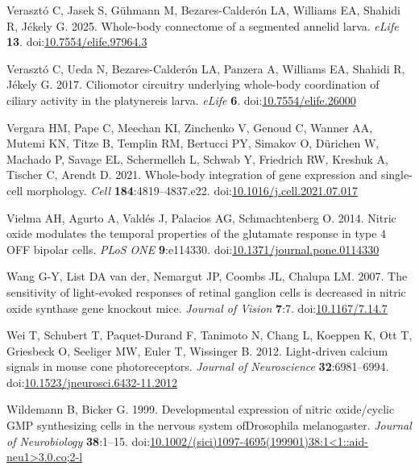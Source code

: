 \documentclass[
  11pt,
  letterpaper,
  DIV=11,
  numbers=noendperiod]{scrartcl}
\newlength{\cslhangindent}
\newenvironment{CSLReferences}[2] %
 {\begin{list}{}{%
  \setlength{\itemindent}{0pt}
  \setlength{\leftmargin}{0pt}
  \setlength{\parsep}{0pt}
  \ifodd #1
   \setlength{\leftmargin}{\cslhangindent}
   \setlength{\itemindent}{-1\cslhangindent}
  \fi
  \setlength{\itemsep}{#2\baselineskip}}}
 {\end{list}}
\begin{document}
\begin{CSLReferences}{1}{0}
Verasztó C, Jasek S, Gühmann M, Bezares-Calderón LA, Williams EA,
Shahidi R, Jékely G. 2025. Whole-body connectome of a segmented annelid
larva. \emph{eLife} \textbf{13}.
doi:\href{https://doi.org/10.7554/elife.97964.3}{10.7554/elife.97964.3}

Verasztó C, Ueda N, Bezares-Calderón LA, Panzera A, Williams EA, Shahidi
R, Jékely G. 2017. Ciliomotor circuitry underlying whole-body
coordination of ciliary activity in the platynereis larva. \emph{eLife}
\textbf{6}.
doi:\href{https://doi.org/10.7554/elife.26000}{10.7554/elife.26000}

Vergara HM, Pape C, Meechan KI, Zinchenko V, Genoud C, Wanner AA, Mutemi
KN, Titze B, Templin RM, Bertucci PY, Simakov O, Dürichen W, Machado P,
Savage EL, Schermelleh L, Schwab Y, Friedrich RW, Kreshuk A, Tischer C,
Arendt D. 2021. Whole-body integration of gene expression and
single-cell morphology. \emph{Cell} \textbf{184}:4819--4837.e22.
doi:\href{https://doi.org/10.1016/j.cell.2021.07.017}{10.1016/j.cell.2021.07.017}

Vielma AH, Agurto A, Valdés J, Palacios AG, Schmachtenberg O. 2014.
Nitric oxide modulates the temporal properties of the glutamate response
in type 4 OFF bipolar cells. \emph{PLoS ONE} \textbf{9}:e114330.
doi:\href{https://doi.org/10.1371/journal.pone.0114330}{10.1371/journal.pone.0114330}

Wang G-Y, List DA van der, Nemargut JP, Coombs JL, Chalupa LM. 2007. The
sensitivity of light-evoked responses of retinal ganglion cells is
decreased in nitric oxide synthase gene knockout mice. \emph{Journal of
Vision} \textbf{7}:7.
doi:\href{https://doi.org/10.1167/7.14.7}{10.1167/7.14.7}

Wei T, Schubert T, Paquet-Durand F, Tanimoto N, Chang L, Koeppen K, Ott
T, Griesbeck O, Seeliger MW, Euler T, Wissinger B. 2012. Light-driven
calcium signals in mouse cone photoreceptors. \emph{Journal of
Neuroscience} \textbf{32}:6981--6994.
doi:\href{https://doi.org/10.1523/jneurosci.6432-11.2012}{10.1523/jneurosci.6432-11.2012}

Wildemann B, Bicker G. 1999. Developmental expression of nitric
oxide/cyclic GMP synthesizing cells in the nervous system ofDrosophila
melanogaster. \emph{Journal of Neurobiology} \textbf{38}:1--15.
doi:\href{https://doi.org/10.1002/(sici)1097-4695(199901)38:1\%3C1::aid-neu1\%3E3.0.co;2-l}{10.1002/(sici)1097-4695(199901)38:1\textless1::aid-neu1\textgreater3.0.co;2-l}


\end{CSLReferences}
\end{document}
